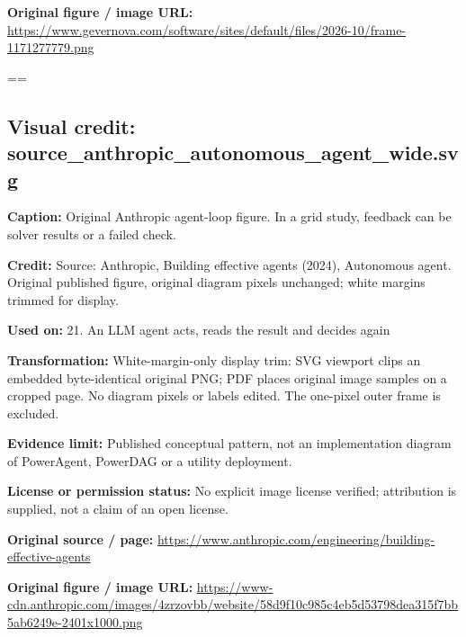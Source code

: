 \documentclass[10pt,letterpaper]{article}
\begin{document}
\textbf{Original figure / image URL:} \href{https://www.gevernova.com/software/sites/default/files/2026-10/frame-1171277779.png}{\small\ttfamily https:/\allowbreak{}/\allowbreak{}www.\allowbreak{}gevernova.\allowbreak{}com/\allowbreak{}software/\allowbreak{}sites/\allowbreak{}default/\allowbreak{}files/\allowbreak{}2026-\allowbreak{}10/\allowbreak{}frame-\allowbreak{}1171277779.\allowbreak{}png}\par
\egroup\par\noindent\box\readingEntry\par\medskip
\setbox\readingEntry=\vbox\bgroup\hsize=\linewidth\subsection*{Visual credit: source\_anthropic\_autonomous\_agent\_wide.svg}
\textbf{Caption:} Original Anthropic agent-loop figure. In a grid study, feedback can be solver results or a failed check.\par
\textbf{Credit:} Source: Anthropic, Building effective agents (2024), Autonomous agent. Original published figure, original diagram pixels unchanged; white margins trimmed for display.\par
\textbf{Used on:} 21. An LLM agent acts, reads the result and decides again\par
\textbf{Transformation:} White-margin-only display trim: SVG viewport clips an embedded byte-identical original PNG; PDF places original image samples on a cropped page. No diagram pixels or labels edited. The one-pixel outer frame is excluded.\par
\textbf{Evidence limit:} Published conceptual pattern, not an implementation diagram of PowerAgent, PowerDAG or a utility deployment.\par
\textbf{License or permission status:} No explicit image license verified; attribution is supplied, not a claim of an open license.\par
\textbf{Original source / page:} \href{https://www.anthropic.com/engineering/building-effective-agents}{\small\ttfamily https:/\allowbreak{}/\allowbreak{}www.\allowbreak{}anthropic.\allowbreak{}com/\allowbreak{}engineering/\allowbreak{}building-\allowbreak{}effective-\allowbreak{}agents}\par
\textbf{Original figure / image URL:} \href{https://www-cdn.anthropic.com/images/4zrzovbb/website/58d9f10c985c4eb5d53798dea315f7bb5ab6249e-2401x1000.png}{\small\ttfamily https:/\allowbreak{}/\allowbreak{}www-\allowbreak{}cdn.\allowbreak{}anthropic.\allowbreak{}com/\allowbreak{}images/\allowbreak{}4zrzovbb/\allowbreak{}website/\allowbreak{}58d9f10c985c4eb5d53798dea315f7bb5ab6249e-\allowbreak{}2401x1000.\allowbreak{}png}\par
\end{document}
